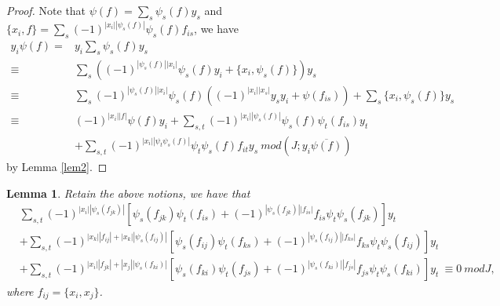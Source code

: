 \documentclass[a4paper,10pt]{amsart}
\newtheorem{lemma}[theorem]{Lemma}
\theoremstyle{definition}
\theoremstyle{remark}
\numberwithin{equation}{section}
\begin{document}
\begin{proof}
Note that $\psi(f)=\sum_{s}\psi_{s}(f)y_{s}$ and $\{x_i,
f\}=\sum_{s}(-1)^{|x_i||\psi_{s}(f)|}\psi_{s}(f)f_{is}$, we have
\begin{align*}
y_i\psi(f)=&y_i\sum_{s}\psi_{s}(f)y_s\\
\equiv&\sum_{s}((-1)^{|\psi_{s}(f)||x_i|}\psi_{s}(f)y_i+\{x_i,
\psi_{s}(f)\})y_{s}\\
\equiv&\sum_{s}(-1)^{|\psi_{s}(f)||x_i|}\psi_{s}(f)((-1)^{|x_i||x_{s}|}y_{s}y_i+\psi(f_{is}))+\sum_{s}\{x_i, \psi_{s}(f)\}y_{s}\\
\equiv&(-1)^{|x_i||f|}\psi(f)y_i+\sum_{s,
t}(-1)^{|x_i||\psi_{s}(f)|}\psi_{s}(f)\psi_{t}(f_{is})y_{t}\\
&+\sum_{s,
t}(-1)^{|x_i||\psi_{t}\psi_{s}(f)|}\psi_{t}\psi_{s}(f)f_{it}y_{s} ~mod (J; y_i\overline{\psi(f)})
\end{align*}
by Lemma \ref{lem2}.
\end{proof}

\begin{lemma}\label{lem5}
Retain the above notions, we have that
\begin{equation}
\begin{split}
&\sum_{s,
t}(-1)^{|x_i||\psi_{s}(f_{jk})|}[\psi_{s}(f_{jk})\psi_{t}(f_{is})+(-1)^{|\psi_{s}(f_{jk})||f_{is}|}f_{is}\psi_{t}\psi_{s}(f_{jk})]y_t\\
&+\sum_{s,
t}(-1)^{|x_k||f_{ij}|+|x_k||\psi_{s}(f_{ij})|}[\psi_{s}(f_{ij})\psi_{t}(f_{ks})+(-1)^{|\psi_{s}(f_{ij})||f_{ks}|}f_{ks}\psi_{t}\psi_{s}(f_{ij})]y_t\\
&+\sum_{s,
t}(-1)^{|x_i||f_{jk}|+|x_j||\psi_{s}(f_{ki})|}[\psi_{s}(f_{ki})\psi_{t}(f_{js})+(-1)^{|\psi_{s}(f_{ki})||f_{js}|}f_{js}\psi_{t}\psi_{s}(f_{ki})]y_t
~\equiv 0 ~mod J,
\end{split}\nonumber
\end{equation}
where $f_{ij}=\{x_i, x_j\}$.
\end{lemma}
\end{document}
